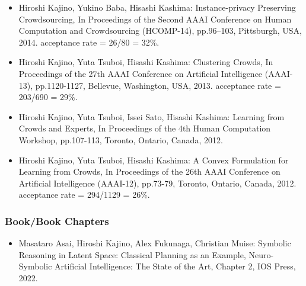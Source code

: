 \documentclass[a4paper,9pt]{article}
\begin{document}
\begin{itemize}
 \item Hiroshi Kajino, Yukino Baba, Hisashi Kashima: Instance-privacy Preserving Crowdsourcing, In Proceedings of the Second AAAI Conference on Human Computation and Crowdsourcing (HCOMP-14), pp.96--103, Pittsburgh, USA, 2014. acceptance rate = 26/80 = 32\%.
 \item Hiroshi Kajino, Yuta Tsuboi, Hisashi Kashima: Clustering Crowds, In Proceedings of the 27th AAAI Conference on Artificial Intelligence (AAAI-13), pp.1120-1127, Bellevue, Washington, USA, 2013. acceptance rate = 203/690 = 29\%.
 \item Hiroshi Kajino, Yuta Tsuboi, Issei Sato, Hisashi Kashima: Learning from Crowds and Experts, In Proceedings of the 4th Human Computation Workshop, pp.107-113, Toronto, Ontario, Canada, 2012.
 \item Hiroshi Kajino, Yuta Tsuboi, Hisashi Kashima: A Convex Formulation for Learning from Crowds, In Proceedings of the 26th AAAI Conference on Artificial Intelligence (AAAI-12), pp.73-79, Toronto, Ontario, Canada, 2012. acceptance rate = 294/1129 = 26\%.
\end{itemize}

\subsubsection*{Book/Book Chapters}
\begin{itemize}
 \item Masataro Asai, Hiroshi Kajino, Alex Fukunaga, Christian Muise: Symbolic Reasoning in Latent Space: Classical Planning as an Example, Neuro-Symbolic Artificial Intelligence: The State of the Art, Chapter 2, IOS Press, 2022.
\end{itemize}

\end{document}
